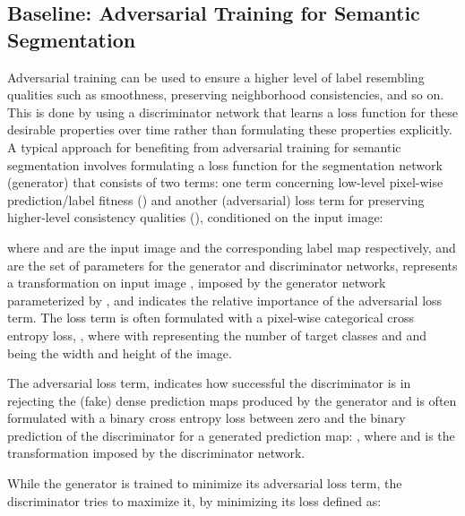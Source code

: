 \documentclass{article} \usepackage{nips13submit_e,times}
\begin{document}
\subsection{Baseline: Adversarial Training for Semantic Segmentation}

Adversarial training can be used to ensure a higher level of label resembling qualities such as smoothness, preserving neighborhood consistencies, and so on.
This is done by using a discriminator network that learns a loss function for these desirable properties over time rather than formulating these properties explicitly.
A typical approach for benefiting from adversarial training for semantic segmentation \cite{luc2016semantic,isola2017image} involves formulating a loss function for the segmentation network (generator) that consists of two terms:
one term concerning low-level pixel-wise prediction/label fitness () and another (adversarial) loss term for preserving higher-level consistency qualities (), conditioned on the input image:

where  and  are the input image and the corresponding label map respectively,  and  are the set of parameters for the generator and discriminator networks,  represents a transformation on input image , imposed by the generator network parameterized by , and  indicates the relative importance of the adversarial loss term.
The loss term  is often formulated with a pixel-wise categorical cross entropy loss, , where  with  representing the number of target classes and  and  being the width and height of the image.

The adversarial loss term,  indicates how successful the discriminator is in rejecting the (fake) dense prediction maps produced by the generator and is often formulated with a binary cross entropy loss between zero and the binary prediction of the discriminator for a generated prediction map: , where  and  is the transformation imposed by the discriminator network.


While the generator is trained to minimize its adversarial loss term, the discriminator tries to maximize it, by minimizing its loss defined as:
\end{document}
